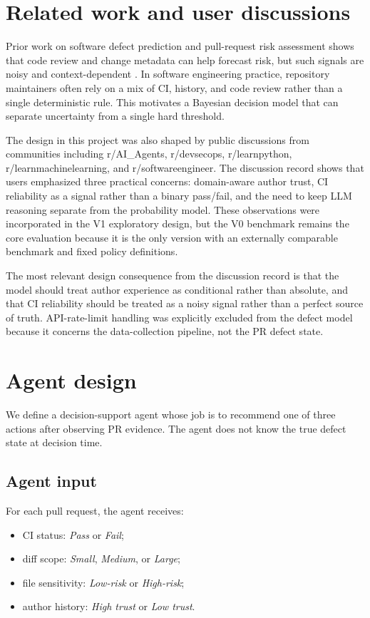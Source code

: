 \documentclass{article}
\begin{document}
\section{Related work and user discussions}

Prior work on software defect prediction and pull-request risk assessment shows that code review and change metadata can help forecast risk, but such signals are noisy and context-dependent \cite{gousios2014,sculley2015}. In software engineering practice, repository maintainers often rely on a mix of CI, history, and code review rather than a single deterministic rule. This motivates a Bayesian decision model that can separate uncertainty from a single hard threshold.

The design in this project was also shaped by public discussions from communities including r/AI\_Agents, r/devsecops, r/learnpython, r/learnmachinelearning, and r/softwareengineer. The discussion record shows that users emphasized three practical concerns: domain-aware author trust, CI reliability as a signal rather than a binary pass/fail, and the need to keep LLM reasoning separate from the probability model. These observations were incorporated in the V1 exploratory design, but the V0 benchmark remains the core evaluation because it is the only version with an externally comparable benchmark and fixed policy definitions.

The most relevant design consequence from the discussion record is that the model should treat author experience as conditional rather than absolute, and that CI reliability should be treated as a noisy signal rather than a perfect source of truth. API-rate-limit handling was explicitly excluded from the defect model because it concerns the data-collection pipeline, not the PR defect state.

\section{Agent design}

We define a decision-support agent whose job is to recommend one of three actions after observing PR evidence. The agent does not know the true defect state at decision time.

\subsection{Agent input}

For each pull request, the agent receives:
\begin{itemize}[leftmargin=1.2em, itemsep=0.2em]
    \item CI status: \emph{Pass} or \emph{Fail};
    \item diff scope: \emph{Small}, \emph{Medium}, or \emph{Large};
    \item file sensitivity: \emph{Low-risk} or \emph{High-risk};
    \item author history: \emph{High trust} or \emph{Low trust}.
\end{itemize}
\end{document}
